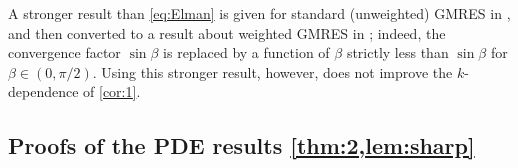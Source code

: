 A stronger result than \cref{eq:Elman} is given for standard (unweighted) GMRES in \cite[Theorem 2.1]{BeGoTy:06}, and then converted to a result about weighted GMRES in \cite[Theorem 5.3]{BoDoGrSpTo:19}; indeed, the convergence factor $\sin \beta$ is replaced by a function of $\beta$ strictly less than $\sin\beta$ for $\beta\in (0,\pi/2)$. Using this stronger result, however, does not improve the $k$-dependence of \cref{cor:1}.
\ere



\subsection{Proofs of the PDE results \cref{thm:2,lem:sharp}}


